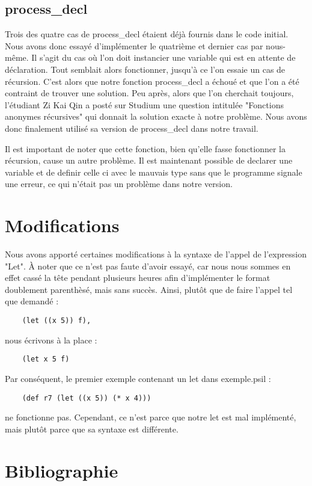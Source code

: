 \documentclass{article}
\begin{document}
\subsection{process\_decl}
Trois des quatre cas de process\_decl étaient déjà fournis dans le code initial. Nous avons donc essayé d'implémenter le quatrième et dernier cas par nous-même.
Il s'agit du cas où l'on doit instancier une variable qui est en attente de déclaration.
Tout semblait alors fonctionner, jusqu'à ce l'on essaie un cas de récursion.
C'est alors que notre fonction process\_decl a échoué et que l'on a été contraint de trouver une solution.
Peu après, alors que l'on cherchait toujours, l'étudiant Zi Kai Qin a posté sur Studium une question intitulée "Fonctions anonymes récursives" qui donnait la solution exacte à notre problème.
Nous avons donc finalement utilisé sa version de process\_decl dans notre travail.

Il est important de noter que cette fonction, bien qu'elle fasse fonctionner la récursion, cause un autre problème. Il est maintenant possible de declarer une variable et de definir celle ci avec le mauvais type sans que le programme signale une erreur, ce qui n'était pas un problème dans notre version. 

\section{Modifications}

Nous avons apporté certaines modifications à la syntaxe de l'appel de l'expression "Let". À noter que ce n'est pas faute d'avoir essayé, car nous nous sommes en effet cassé la tête pendant plusieurs heures afin d'implémenter le format doublement parenthèsé, mais sans succès. Ainsi, plutôt que de faire l'appel tel que demandé :
\begin{verbatim}
    (let ((x 5)) f),
\end{verbatim}
nous écrivons à la place :
\begin{verbatim}
    (let x 5 f) 
\end{verbatim}
Par conséquent, le premier exemple contenant un let dans exemple.psil :
\begin{verbatim}
    (def r7 (let ((x 5)) (* x 4)))  
\end{verbatim}
ne fonctionne pas. Cependant, ce n'est parce que notre let est mal implémenté, mais plutôt parce que sa syntaxe est différente.

\section{Bibliographie}\label{sec:biblio}
\end{document}
